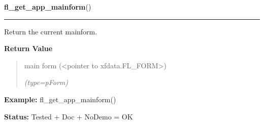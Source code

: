 \hspace{.8\funcindent}\begin{boxedminipage}{\funcwidth}

    \raggedright \textbf{fl\_get\_app\_mainform}()

    \vspace{-1.5ex}

    \rule{\textwidth}{0.5\fboxrule}
\setlength{\parskip}{2ex}
    Return the current mainform.

\setlength{\parskip}{1ex}
      \textbf{Return Value}
    \vspace{-1ex}

      \begin{quote}
      main form ({\textless}pointer to xfdata.FL\_FORM{\textgreater})

      {\it (type=pForm)}

      \end{quote}

\textbf{Example:} fl\_get\_app\_mainform()



\textbf{Status:} Tested + Doc + NoDemo = OK



    \end{boxedminipage}

    \label{xformslib:library:fl_set_app_nomainform}

    \vspace{0.5ex}

